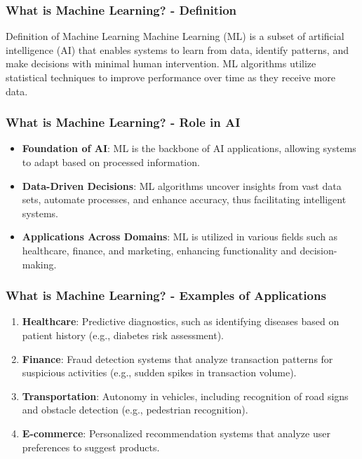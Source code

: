 \documentclass[aspectratio=169]{beamer}
\begin{document}
\begin{frame}[fragile]
    \frametitle{What is Machine Learning? - Definition}
    \begin{block}{Definition of Machine Learning}
        Machine Learning (ML) is a subset of artificial intelligence (AI) that enables systems to learn from data, identify patterns, and make decisions with minimal human intervention. ML algorithms utilize statistical techniques to improve performance over time as they receive more data.
    \end{block}
\end{frame}

\begin{frame}[fragile]
    \frametitle{What is Machine Learning? - Role in AI}
    \begin{itemize}
        \item \textbf{Foundation of AI}: ML is the backbone of AI applications, allowing systems to adapt based on processed information.
        \item \textbf{Data-Driven Decisions}: ML algorithms uncover insights from vast data sets, automate processes, and enhance accuracy, thus facilitating intelligent systems.
        \item \textbf{Applications Across Domains}: ML is utilized in various fields such as healthcare, finance, and marketing, enhancing functionality and decision-making.
    \end{itemize}
\end{frame}

\begin{frame}[fragile]
    \frametitle{What is Machine Learning? - Examples of Applications}
    \begin{enumerate}
        \item \textbf{Healthcare}: Predictive diagnostics, such as identifying diseases based on patient history (e.g., diabetes risk assessment).
        \item \textbf{Finance}: Fraud detection systems that analyze transaction patterns for suspicious activities (e.g., sudden spikes in transaction volume).
        \item \textbf{Transportation}: Autonomy in vehicles, including recognition of road signs and obstacle detection (e.g., pedestrian recognition).
        \item \textbf{E-commerce}: Personalized recommendation systems that analyze user preferences to suggest products.
    \end{enumerate}
\end{frame}
\end{document}
